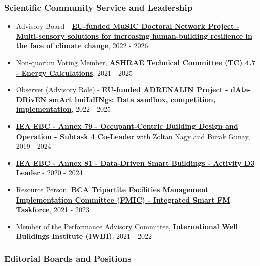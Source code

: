 \documentclass[10pt,a4paper]{article}
\begin{document}
\begin{small}

\subsubsection*{Scientific Community Service and Leadership}

\begin{itemize}
\item
Advisory Board - \href{https://www.linkedin.com/company/music-doctoral-network/}{\textbf{EU-funded MuSIC Doctoral Network Project - Multi-sensory solutions for increasing human-building resilience in the face of climate change}}, 2022 - 2026
\item
Non-quorum Voting Member, \textbf{\href{https://tpc.ashrae.org/?cmtKey=bba8e395-cc3c-4f2e-ace5-7f658af05f85}{ASHRAE Technical Committee (TC) 4.7 - Energy Calculations}}, 2021 - 2025
\item
Observer (Advisory Role) - \href{https://adrenalin.energy/}{\textbf{EU-funded ADRENALIN Project - dAta-DRivEN smArt buiLdINgs: Data sandbox, competition, implementation}}, 2022 - 2025
\item
\textbf{\href{http://annex79.iea-ebc.org/}{IEA EBC - Annex 79 - Occupant-Centric Building Design and Operation - Subtask 4 Co-Leader}} with Zoltan Nagy and Burak Gunay, 2019 - 2024
\item
\textbf{\href{https://annex81.iea-ebc.org/}{IEA EBC - Annex 81 - Data-Driven Smart Buildings - Activity D3 Leader}} - 2020 - 2024
\item
Resource Person, \textbf{\href{https://www.bca.gov.sg/greenmark/facilities-management-industry-transformation-fmic.html}{BCA Tripartite Facilities Management Implementation Committee (FMIC) - Integrated Smart FM Taskforce}}, 2021 - 2023
\item
\href{https://resources.wellcertified.com/articles/introducing-the-2021-iwbi-advisors/}{Member of the Performance Advisory Committee}, \textbf{International Well Buildings Institute (IWBI)}, 2021 - 2022

\end{itemize}

\subsubsection*{Editorial Boards and Positions}
\begin{itemize}


\end{itemize}
\end{small}
\end{document}
